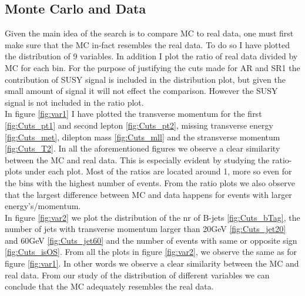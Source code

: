 \documentclass{article}
\begin{document}
\subsection{Monte Carlo and Data}\label{subsec:MCandData}
Given the main idea of the search is to compare MC to real data, one must first make sure that the MC in-fact resembles the real data. To do so I have plotted the distribution of 9 variables. In addition I plot the ratio of real data divided by MC for each bin. For the purpose of justifying the cuts made for AR and SR1 the contribution of SUSY signal is included in the distribution plot, but given the small amount of signal it will not effect the comparison. However the SUSY signal is not included in the ratio plot.
\\
In figure \ref{fig:var1} I have plotted the transverse momentum for the first \ref{fig:Cuts_pt1} and second lepton \ref{fig:Cuts_pt2}, missing transverse energy \ref{fig:Cuts_met}, dilepton mass \ref{fig:Cuts_mll} and the stransverse momentum \ref{fig:Cuts_T2}. In all the aforementioned figures we observe a clear similarity between the MC and real data. This is especially evident by studying the ratio-plots under each plot. Most of the ratios are located around 1, more so even for the bins with the highest number of events. From the ratio plots we also observe that the largest difference between MC and data happens for events with larger energy's/momentum.  
\\
In figure \ref{fig:var2} we plot the distribution of the nr of B-jets \ref{fig:Cuts_bTag}, the number of jets with transverse momentum larger than 20GeV \ref{fig:Cuts_jet20}
and 60GeV \ref{fig:Cuts_jet60} and the number of events with same or opposite sign \ref{fig:Cuts_isOS}. From all the plots in figure \ref{fig:var2}, we observe the same as for figure \ref{fig:var1}. In other words we observe a clear similarity between the MC and real data. From our study of the distribution of different variables we can conclude that the MC adequately resembles the real data.
\end{document}
